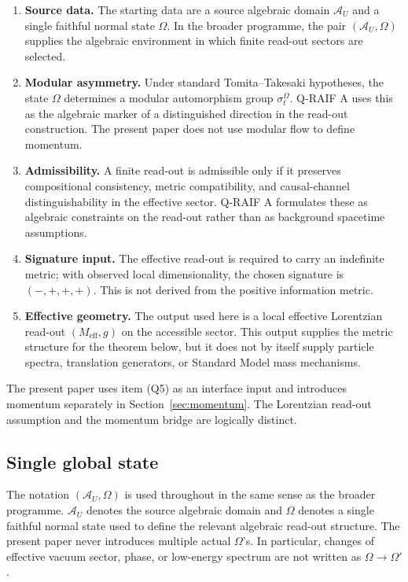 \documentclass[12pt,a4paper]{article}
\theoremstyle{definition}
\theoremstyle{remark}
\newcommand{\AU}{\mathcal{A}_U}
\newcommand{\Meff}{M_{\mathrm{eff}}}
\newcommand{\Omegastate}{\Omega}
\begin{document}
\begin{enumerate}[label=(Q\arabic*), leftmargin=*]
\item \textbf{Source data.} The starting data are a source algebraic domain $\AU$ and a single faithful normal state $\Omegastate$. In the broader programme, the pair $(\AU,\Omegastate)$ supplies the algebraic environment in which finite read-out sectors are selected.
\item \textbf{Modular asymmetry.} Under standard Tomita--Takesaki hypotheses, the state $\Omegastate$ determines a modular automorphism group $\sigma_t^\Omegastate$. Q-RAIF A uses this as the algebraic marker of a distinguished direction in the read-out construction. The present paper does not use modular flow to define momentum.
\item \textbf{Admissibility.} A finite read-out is admissible only if it preserves compositional consistency, metric compatibility, and causal-channel distinguishability in the effective sector. Q-RAIF A formulates these as algebraic constraints on the read-out rather than as background spacetime assumptions.
\item \textbf{Signature input.} The effective read-out is required to carry an indefinite metric; with observed local dimensionality, the chosen signature is $(-,+,+,+)$.  This is not derived from the positive information metric.
\item \textbf{Effective geometry.} The output used here is a local effective Lorentzian read-out $(\Meff,g)$ on the accessible sector. This output supplies the metric structure for the theorem below, but it does not by itself supply particle spectra, translation generators, or Standard Model mass mechanisms.
\end{enumerate}

The present paper uses item (Q5) as an interface input and introduces momentum separately in Section~\ref{sec:momentum}.  The Lorentzian read-out assumption and the momentum bridge are logically distinct.

\subsection{Single global state}

The notation $(\AU,\Omegastate)$ is used throughout in the same sense as the broader programme. $\AU$ denotes the source algebraic domain and $\Omegastate$ denotes a single faithful normal state used to define the relevant algebraic read-out structure. The present paper never introduces multiple actual $\Omegastate$'s. In particular, changes of effective vacuum sector, phase, or low-energy spectrum are not written as $\Omegastate\to\Omegastate'$.
\end{document}

